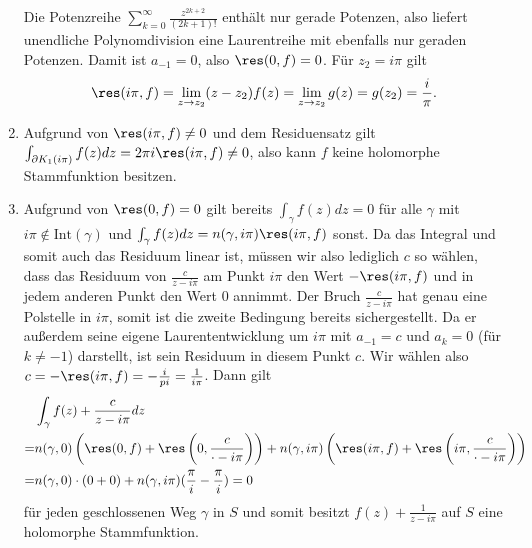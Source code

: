 \documentclass[a4paper]{article}
\begin{document}
\begin{enumerate}
\begin{equation*}
	\end{equation*}
	Die Potenzreihe $\sum_{k = 0}^{\infty} \frac{z^{2k+2}}{(2k+1)!}$ enthält nur gerade Potenzen, also liefert unendliche Polynomdivision eine Laurentreihe mit ebenfalls nur geraden Potenzen. Damit ist $a_{-1} = 0$, also $\res(0, f) = 0$.
	Für $z_2 = i \pi$ gilt
	\begin{equation*}
		\res(i \pi, f) = \lim_{z \to z_2} (z - z_2) f(z) = \lim_{z \to z_2} g(z) = g(z_2) = \frac{i}{\pi} \text{.}
	\end{equation*}
	\item Aufgrund von $\res(i \pi, f) \neq 0$ und dem Residuensatz gilt  $\int_{\partial K_1(i \pi)} f(z) dz = 2 \pi i \res(i \pi, f) \neq 0$, also kann $f$ keine holomorphe Stammfunktion besitzen.
	\item Aufgrund von $\res(0, f) = 0$ gilt bereits $\int_\gamma f(z) dz = 0$ für alle $\gamma$ mit $i \pi \notin \mathrm{Int}(\gamma)$ und $\int_\gamma f(z) dz = n(\gamma, i \pi) \res(i \pi, f)$ sonst.
	Da das Integral und somit auch das Residuum linear ist, müssen wir also lediglich $c$ so wählen, dass das Residuum von $\frac{c}{z - i \pi}$ am Punkt $i \pi$ den Wert $- \res(i \pi, f)$ und in jedem anderen Punkt den Wert $0$ annimmt.
	Der Bruch $\frac{c}{z - i \pi}$ hat genau eine Polstelle in $i \pi$, somit ist die zweite Bedingung bereits sichergestellt. Da er außerdem seine eigene Laurententwicklung um $i \pi$ mit $a_{-1} = c$ und $a_k = 0$ (für $k \neq -1$) darstellt, ist sein Residuum in diesem Punkt $c$.
	Wir wählen also $c = - \res(i \pi, f) = - \frac{i}{pi} = \frac{1}{i \pi}$. Dann gilt
	\begin{align*}
		&\int_\gamma f(z) + \frac{c}{z - i \pi} dz \\ = & n(\gamma, 0) \left(\res(0, f) + \res\left(0, \frac{c}{\cdot - i \pi}\right)\right) + n(\gamma, i \pi) \left(\res(i \pi, f) + \res\left(i \pi, \frac{c}{\cdot - i \pi}\right)\right)\\ = & n(\gamma, 0) \cdot (0 + 0) + n(\gamma, i \pi) (\frac{\pi}{i} - \frac{\pi}{i}) = 0
	\end{align*}
	für jeden geschlossenen Weg $\gamma$ in $S$	und somit besitzt $f(z) + \frac{1}{z - i \pi}$ auf $S$ eine holomorphe Stammfunktion.

\end{enumerate}
\end{document}
